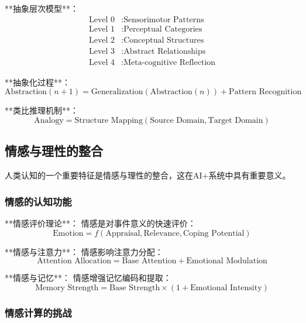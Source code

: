 **抽象层次模型**：
\begin{align}
\text{Level 0} &: \text{Sensorimotor Patterns} \\
\text{Level 1} &: \text{Perceptual Categories} \\
\text{Level 2} &: \text{Conceptual Structures} \\
\text{Level 3} &: \text{Abstract Relationships} \\
\text{Level 4} &: \text{Meta-cognitive Reflection}
\end{align}

**抽象化过程**：
\begin{equation}
\text{Abstraction}(n+1) = \text{Generalization}(\text{Abstraction}(n)) + \text{Pattern Recognition}
\end{equation}

**类比推理机制**：
\begin{equation}
\text{Analogy} = \text{Structure Mapping}(\text{Source Domain}, \text{Target Domain})
\end{equation}

\subsection{情感与理性的整合}

人类认知的一个重要特征是情感与理性的整合，这在AI+系统中具有重要意义。

\subsubsection{情感的认知功能} %

**情感评价理论**：
情感是对事件意义的快速评价：
\begin{equation}
\text{Emotion} = f(\text{Appraisal}, \text{Relevance}, \text{Coping Potential})
\end{equation}

**情感与注意力**：
情感影响注意力分配：
\begin{equation}
\text{Attention Allocation} = \text{Base Attention} + \text{Emotional Modulation}
\end{equation}

**情感与记忆**：
情感增强记忆编码和提取：
\begin{equation}
\text{Memory Strength} = \text{Base Strength} \times (1 + \text{Emotional Intensity})
\end{equation}

\subsubsection{情感计算的挑战} %

